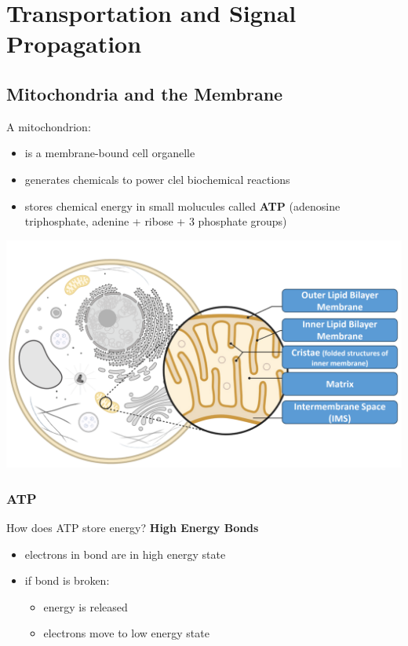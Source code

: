 \documentclass[11pt,fleqn]{book} %
\begin{document}
\chapter{Transportation and Signal Propagation}
\section{Mitochondria and the Membrane}
A mitochondrion:
\begin{itemize}
    \item is a membrane-bound cell organelle
    \item generates chemicals to power clel biochemical reactions
    \item stores chemical energy in small molucules called \textbf{ATP} (adenosine triphosphate, adenine + ribose + 3 phosphate groups)
\end{itemize}
\begin{center}
    \includegraphics[width=0.65\linewidth]{Pictures/Screenshot 2024-02-25 191455.png}
\end{center}
\subsection{ATP}
How does ATP store energy?
\textbf{High Energy Bonds}
\begin{itemize}
    \item electrons in bond are in high energy state
    \item if bond is broken:
    \begin{itemize}
        \item energy is released
        \item electrons move to low energy state
    \end{itemize}
\end{itemize} 
\end{document}
